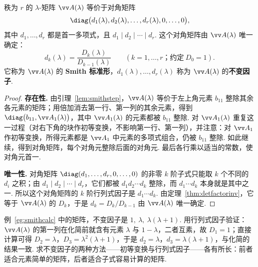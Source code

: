 	\begin{theorem}\label{thm:smith}
		秩为 $r$ 的 $\lambda$-矩阵 $\vv A(\lambda)$ 等价于对角矩阵
		\[\diag\big(d_1(\lambda),d_2(\lambda),\ldots,d_r(\lambda),0,\ldots,0\big),\]
		其中 $d_1,\ldots,d_r$ 都是首一多项式，且 $d_1\mid d_2\mid\cdots\mid d_r$. 这个对角矩阵由 $\vv A(\lambda)$ 唯一确定：
		\[d_k(\lambda)=\frac{D_k(\lambda)}{D_{k-1}(\lambda)}\qquad(k=1,\ldots,r\text{；约定}\ D_0=1).\]
		它称为 $\vv A(\lambda)$ 的 \textbf{Smith 标准形}，$d_1(\lambda),\ldots,d_r(\lambda)$ 称为 $\vv A(\lambda)$ 的\textbf{不变因子}.
	\end{theorem}
	\begin{proof}
		\textbf{存在性.} 由引理~\ref{lem:smithstep}，$\vv A(\lambda)$ 等价于左上角元素 $b_{11}$ 整除其余各元素的矩阵；用倍加消去第一行、第一列的其余元素，得到 $\diag\big(b_{11},\vv A_1(\lambda)\big)$，其中 $\vv A_1(\lambda)$ 的元素都被 $b_{11}$ 整除. 对 $\vv A_1(\lambda)$ 重复这一过程（对右下角的块作初等变换，不影响第一行、第一列），并注意：对 $\vv A_1$ 作初等变换，所得元素都是 $\vv A_1$ 中元素的多项式组合，仍被 $b_{11}$ 整除. 如此继续，得到对角矩阵，每个对角元整除后面的对角元. 最后各行乘以适当的常数，使对角元首一.
		
		\textbf{唯一性.} 对角矩阵 $\diag(d_1,\ldots,d_r,0,\ldots,0)$ 的非零 $k$ 阶子式只能取 $k$ 个不同的 $d_i$ 之积；由 $d_1\mid d_2\mid\cdots\mid d_r$，它们都被 $d_1d_2\cdots d_k$ 整除，而 $d_1\cdots d_k$ 本身就是其中之一. 所以这个对角矩阵的 $k$ 阶行列式因子是 $d_1\cdots d_k$. 由定理~\ref{thm:detfactorinv}，它等于 $\vv A(\lambda)$ 的 $D_k$，于是 $d_k=D_k/D_{k-1}$ 由 $\vv A(\lambda)$ 唯一确定.
	\end{proof}
	
	例~\ref{eg:smithcalc} 中的矩阵，不变因子是 $1,\ \lambda,\ \lambda(\lambda+1)$. 用行列式因子验证：$\vv A(\lambda)$ 的第一列在化简前就含有元素 $\lambda$ 与 $1-\lambda$，二者互素，故 $D_1=1$；直接计算可得 $D_2=\lambda$，$D_3=\lambda^2(\lambda+1)$，于是 $d_2=\lambda$，$d_3=\lambda(\lambda+1)$，与化简的结果一致. 求不变因子的两种方法——初等变换与行列式因子——各有所长：前者适合元素简单的矩阵，后者适合子式容易计算的矩阵.
	
